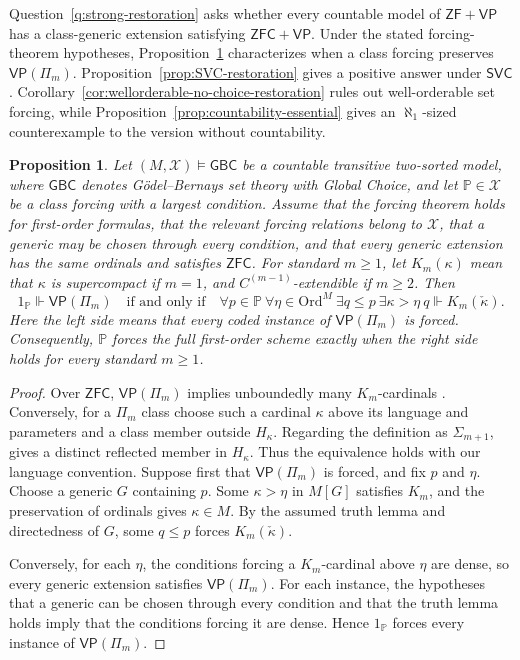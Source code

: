 \documentclass[11pt,a4paper]{amsart}
\newcommand{\VP}{\mathsf{VP}}
\newcommand{\ZF}{\mathsf{ZF}}
\newcommand{\ZFC}{\mathsf{ZFC}}
\newcommand{\GBC}{\mathsf{GBC}}
\newcommand{\Ord}{\mathrm{Ord}}
\theoremstyle{plain}
\newtheorem{proposition}[theorem]{Proposition}
\theoremstyle{definition}
\theoremstyle{remark}
\begin{document}
Question~\ref{q:strong-restoration} asks whether every countable model of $\ZF+\VP$ has a class-generic extension satisfying $\ZFC+\VP$.  Under the stated forcing-theorem hypotheses, Proposition~\ref{prop:class-forcing-criteria} characterizes when a class forcing preserves $\VP(\Pi_m)$.  Proposition~\ref{prop:SVC-restoration} gives a positive answer under $\mathsf{SVC}$.  Corollary~\ref{cor:wellorderable-no-choice-restoration} rules out well-orderable set forcing, while Proposition~\ref{prop:countability-essential} gives an $\aleph_1$-sized counterexample to the version without countability.

\begingroup

\begin{proposition}\label{prop:class-forcing-criteria}
Let $(M,\mathcal X)\models\GBC$ be a countable transitive two-sorted model, {where $\GBC$ denotes G\"odel--Bernays set theory with Global Choice}, and let $\mathbb P\in\mathcal X$ be a class forcing with a largest condition.  Assume that the forcing theorem holds for first-order formulas, that the relevant forcing relations belong to $\mathcal X$, that a generic may be chosen through every condition, and that every generic extension has the same ordinals and satisfies $\ZFC$.  For standard $m\geq1$, let $K_m(\kappa)$ mean that $\kappa$ is supercompact if $m=1$, and $C^{(m-1)}$-extendible if $m\geq2$.  Then
\[
1_{\mathbb P}\Vdash\VP(\Pi_m)\quad\text{if and only if}\quad
\forall p\in\mathbb P\ \forall\eta\in\Ord^M\ 
\exists q\leq p\ \exists\kappa>\eta\ 
q\Vdash K_m(\check\kappa).
\]
Here the left side means that every coded instance of $\VP(\Pi_m)$ is forced.  Consequently, $\mathbb P$ forces the full first-order scheme exactly when the right side holds for every standard $m\geq1$.
\end{proposition}

\begin{proof}
Over $\ZFC$, $\VP(\Pi_m)$ implies unboundedly many $K_m$-cardinals \cite[Theorem~4.3(2), Corollary~4.7, and the paragraph following Theorem~4.12]{BagariaCn}.  Conversely, for a $\Pi_m$ class choose such a cardinal $\kappa$ above its language and parameters and a class member outside $H_\kappa$.  Regarding the definition as $\Sigma_{m+1}$, \cite[Theorems~4.5 and~4.11]{BagariaCn} gives a distinct reflected member in $H_\kappa$.  Thus the equivalence holds with our language convention.  Suppose first that $\VP(\Pi_m)$ is forced, and fix $p$ and $\eta$.  Choose a generic $G$ containing $p$.  Some $\kappa>\eta$ in $M[G]$ satisfies $K_m$, and the preservation of ordinals gives $\kappa\in M$.  By the assumed truth lemma and directedness of $G$, some $q\leq p$ forces $K_m(\check\kappa)$.

Conversely, for each $\eta$, the conditions forcing a $K_m$-cardinal above $\eta$ are dense, so every generic extension satisfies $\VP(\Pi_m)$.  For each instance, the hypotheses that a generic can be chosen through every condition and that the truth lemma holds imply that the conditions forcing it are dense.  Hence $1_{\mathbb P}$ forces every instance of $\VP(\Pi_m)$.
\end{proof}
\endgroup
\end{document}
